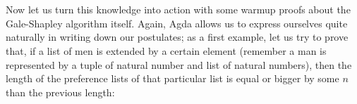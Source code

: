 {\begin{code}
\AgdaSymbol{)}\AgdaSpace{}%
\AgdaSymbol{=}\AgdaSpace{}%
\AgdaSpace{}%
\AgdaSymbol{(}\AgdaSpace{}%
\AgdaSymbol{)}\AgdaSpace{}%
\AgdaSpace{}%
\<%
\\
\>[0]\AgdaSpace{}%
\AgdaSymbol{(}\AgdaSpace{}%
\AgdaSymbol{)}\AgdaSpace{}%
\AgdaSymbol{(}\AgdaSpace{}%
\AgdaSymbol{)}\AgdaSpace{}%
\AgdaSpace{}%
\AgdaSymbol{=}\AgdaSpace{}%
\AgdaSpace{}%
\AgdaSymbol{(}\AgdaSpace{}%
\AgdaSpace{}%
\AgdaSpace{}%
\AgdaSymbol{)}\<%
\\
\>[0]\AgdaSpace{}%
\AgdaSymbol{(}\AgdaSpace{}%
\AgdaSymbol{)}\AgdaSpace{}%
\AgdaSymbol{(}\AgdaSpace{}%
\AgdaSymbol{)}\AgdaSpace{}%
\AgdaSymbol{(}\AgdaSpace{}%
\AgdaSymbol{)}\AgdaSpace{}%
\AgdaSymbol{=}\AgdaSpace{}%
\AgdaSpace{}%
\AgdaSymbol{(}\AgdaSpace{}%
\AgdaSymbol{(}\AgdaSpace{}%
\AgdaSymbol{)}\AgdaSpace{}%
\AgdaSpace{}%
\AgdaSymbol{(}\AgdaSpace{}%
\AgdaSymbol{))}\<%
\end{code}

Now let us turn this knowledge into action with some warmup proofs about the Gale-Shapley algorithm itself. Again, Agda allows us to express ourselves quite naturally in writing down our postulates; as a first example, let us try to prove that, if a list of men is extended by a certain element (remember a man is represented by a tuple of natural number and list of natural numbers), then the length of the preference lists of that particular list is equal or bigger by some $n$ than the previous length:

}
